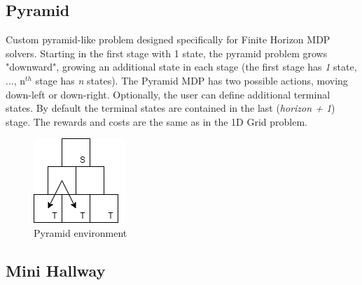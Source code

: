 \subsection{Pyramid}
Custom pyramid-like problem designed specifically for Finite Horizon MDP solvers. Starting in the first stage with 1 state, the pyramid problem grows "downward", growing an additional state in each stage (the first stage has \textit{1} state, ..., n$^{th}$ stage has \textit{n} states). The Pyramid MDP has two possible actions, moving down-left or down-right. Optionally, the user can define additional terminal states. By default the terminal states are contained in the last (\textit{horizon + 1}) stage. The rewards and costs are the same as in the 1D Grid problem.

\begin{figure}[ht]
\caption{Pyramid environment}
\centering
\includegraphics[scale=0.5]{pictures/Pyramid.png}
\end{figure}

\subsection{Mini Hallway}


